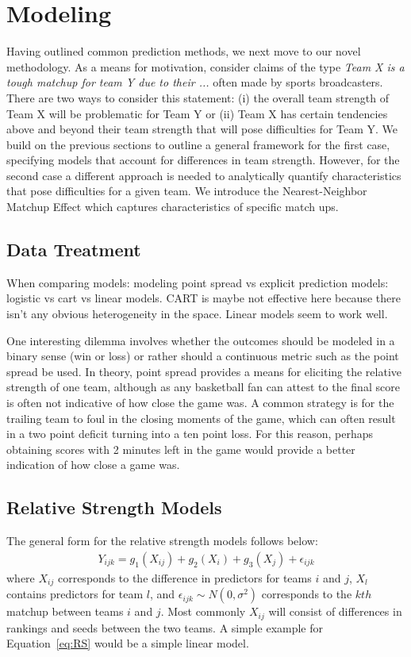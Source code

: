 \section{Modeling}
Having outlined common prediction methods, we next move to our novel methodology.  As a means for motivation, consider claims of the type \emph{Team X is a tough matchup for team Y due to their ...} often made by sports broadcasters.  There are two ways to consider this statement: (i) the overall team strength of Team X will be problematic for Team Y or (ii) Team X has certain tendencies above and beyond their team strength that will pose difficulties for Team Y.  We build on the previous sections to outline a general framework for the first case, specifying models that account for differences in team strength.  However, for the second case a different approach is needed to analytically quantify characteristics that pose difficulties for a given team.  We introduce the Nearest-Neighbor Matchup Effect which captures characteristics of specific match ups.  

\subsection{Data Treatment}
When comparing models: modeling point spread vs explicit prediction models: logistic vs cart vs linear models.
CART is maybe not effective here because there isn't any obvious heterogeneity in the space. Linear models seem to work well.

One interesting dilemma involves whether the outcomes should be modeled in a binary sense (win or loss) or rather should a continuous metric such as the point spread be used.  In theory, point spread provides a means for eliciting the relative strength of one team, although as any basketball fan can attest to the final score is often not indicative of how close the game was.  A common strategy is for the trailing team to foul in the closing moments of the game, which can often result in a two point deficit turning into a ten point loss.  For this reason, perhaps obtaining scores with 2 minutes left in the game would provide a better indication of how close a game was.

\subsection{Relative Strength Models}
The general form for the relative strength models follows below:
\begin{eqnarray}
Y_{ijk} = g_1(X_{ij}) + g_2(X_i) + g_3(X_j) +  \epsilon_{ijk}
\label{eq:RS}
\end{eqnarray}
where $X_{ij}$ corresponds to the difference in predictors for teams $i$ and $j$, $X_l$ contains predictors for team $l$, and $\epsilon_{ijk} \sim N(0,\sigma^2)$ corresponds to the $kth$ matchup between teams $i$ and $j$.  Most commonly $X_{ij}$ will consist of differences in rankings and seeds between the two teams.  A simple example for Equation~\ref{eq:RS} would be a simple linear model.

